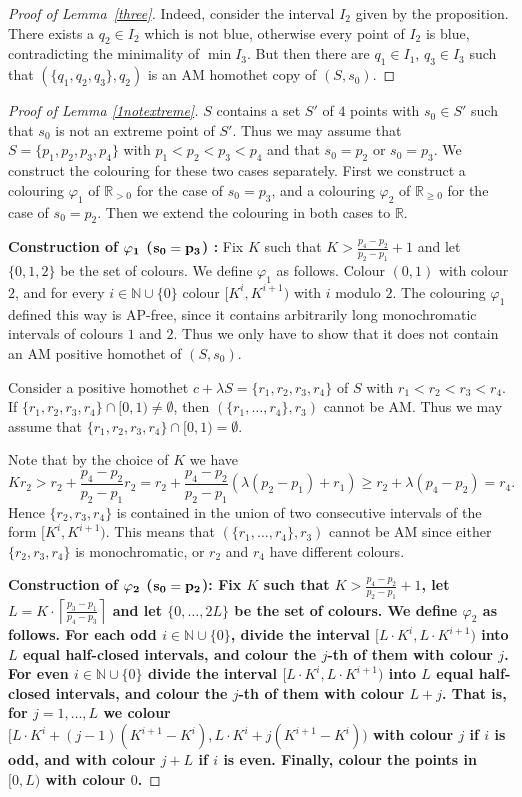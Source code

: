 \documentclass[12pt]{article}
\newcommand{\N}{{\mathbb N}}
\theoremstyle{plain}
\theoremstyle{definition}
\begin{document}
\begin{proof}[Proof of Lemma~\ref{three}]
Indeed, consider the interval $I_2$ given by the proposition. There exists a $q_2\in I_2$ which is not blue, otherwise every point of $I_2$ is blue, contradicting the minimality of $\min I_3$. But then there are $q_1\in I_1$, $q_3\in I_3$ such that $(\{q_1,q_2,q_3\},q_2)$ is an AM homothet copy of $(S,s_0)$.
\end{proof}


\begin{proof}[Proof of Lemma \ref{1notextreme}]
$S$ contains a set $S'$ of $4$ points with $s_0\in S'$ such that $s_0$ is not an extreme point of $S'$. Thus we may assume that $S=\{p_1,p_2,p_3,p_4\}$ with $p_1<p_2<p_3<p_4$ and that $s_0=p_2$ or $s_0=p_3$.
We construct the colouring for these two cases separately.
First we construct a colouring $\varphi_1$ of $\mathbb{R}_{ >0}$ for the case of $s_0=p_3$, and a colouring $\varphi_2$ of $\mathbb{R}_{\geq 0}$ for the case of $s_0=p_2$. Then we extend the colouring in both cases to $\mathbb{R}$.

\medskip

\textbf{Construction of $\bf {\varphi_1}$ ($\bf s_0=p_3$) :} \rm Fix $K$ such that $K>\frac{p_4-p_2}{p_2-p_1}+1$ and let $\{0,1,2\}$ be the set of colours. We define $\varphi_1$ as follows. Colour $(0,1)$ with colour $2$, and for every $i\in \N\cup \{0\}$ colour $[K^i,K^{i+1})$ with $i$ modulo $2$. The colouring $\varphi_1$ defined this way is AP-free, since it contains arbitrarily long monochromatic intervals of colours $1$ and $2$. Thus we only have to show that it does not contain an AM positive homothet of $(S,s_0)$.

Consider a positive homothet $c+\lambda S=\{r_1,r_2,r_3,r_4\}$ of $S$ with $r_1<r_2<r_3<r_4$. If $\{r_1,r_2,r_3,r_4\}\cap [0,1)\neq \emptyset$, then $(\{r_1,\dots,r_4\},r_3)$ cannot be AM. Thus we may assume that $\{r_1,r_2,r_3,r_4\}\cap [0,1)=\emptyset$.

Note that by the choice of $K$ we have
\[Kr_2>
r_2+\frac{p_4-p_2}{p_2-p_1} r_2=
r_2+\frac{p_4-p_2}{p_2-p_1} \left (\lambda(p_2-p_1)+r_1\right )\ge
r_2+\lambda (p_4-p_2)=
r_4.\]
Hence $\{r_2,r_3,r_4\}$ is contained in the union of two consecutive intervals of the form $[K^i,K^{i+1})$. This means that $(\{r_1,\dots,r_4\},r_3)$ cannot be AM since either $\{r_2,r_3,r_4\}$ is monochromatic, or $r_2$ and $r_4$ have different colours.

\medskip
    
\bf Construction of $\bf \varphi_2$ ($\bf s_0=p_2$):  \rm Fix $K$ such that $K>\frac{p_4-p_2}{p_2-p_1}+1$, let $L=K\cdot \left \lceil \frac{p_3-p_1}{p_4-p_3}\right \rceil$ and let $\{0,\dots,2L\}$ be the set of colours. We define $\varphi_2$ as follows. For each odd $i\in \N\cup \{0\}$, divide the interval $[L\cdot K^i,L\cdot K^{i+1})$ into $L$ equal half-closed intervals, and colour the $j$-th of them with colour $j$. For even $i\in \N\cup \{0\}$ divide the interval $[L\cdot K^i,L\cdot K^{i+1})$ into $L$ equal half-closed intervals, and colour the $j$-th of them with colour $L+j$. That is, for $j=1,\dots,L$ we colour $[L\cdot K^i+(j-1)(K^{i+1}-K^i),L\cdot K^i+j(K^{i+1}-K^i))$ with colour $j$ if $i$ is odd, and with colour $j+L$ if $i$ is even. Finally, colour the points in $[0,L)$ with colour $0$. 
    

\end{proof}
\end{document}
